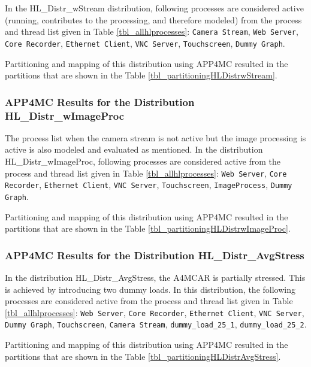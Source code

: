 In the HL{\_}Distr{\_}wStream distribution, following processes are considered active (running, contributes to the processing, and therefore modeled) from the process and thread list given in Table \ref{tbl_allhlprocesses}: \texttt{Camera Stream}, \texttt{Web Server}, \texttt{Core Recorder}, \texttt{Ethernet Client}, \texttt{VNC Server}, \texttt{Touchscreen}, \texttt{Dummy Graph}.

Partitioning and mapping of this distribution using APP4MC resulted in the partitions that are shown in the Table \ref{tbl_partitioningHLDistrwStream}.

\partitioningHLDistrwStream

\subsubsection{APP4MC Results for the Distribution HL{\_}Distr{\_}wImageProc}

The process list when the camera stream is not active but the image processing is active is also modeled and evaluated as mentioned. In the distribution HL{\_}Distr{\_}wImageProc, following processes are considered active from the process and thread list given in Table \ref{tbl_allhlprocesses}: \texttt{Web Server}, \texttt{Core Recorder}, \texttt{Ethernet Client}, \texttt{VNC Server}, \texttt{Touchscreen}, \texttt{ImageProcess}, \texttt{Dummy Graph}.

Partitioning and mapping of this distribution using APP4MC resulted in the partitions that are shown in the Table \ref{tbl_partitioningHLDistrwImageProc}.

\partitioningHLDistrwImageProc


\subsubsection{APP4MC Results for the Distribution HL{\_}Distr{\_}AvgStress}

In the distribution HL{\_}Distr{\_}AvgStress, the A4MCAR is partially stressed. This is achieved by introducing two dummy loads. In this distribution, the following processes are considered active from the process and thread list given in Table \ref{tbl_allhlprocesses}: \texttt{Web Server}, \texttt{Core Recorder}, \texttt{Ethernet Client}, \texttt{VNC Server}, \texttt{Dummy Graph}, \texttt{Touchscreen}, \texttt{Camera Stream}, \texttt{dummy{\_}load{\_}25{\_}1}, \texttt{dummy{\_}load{\_}25{\_}2}.

Partitioning and mapping of this distribution using APP4MC resulted in the partitions that are shown in the Table \ref{tbl_partitioningHLDistrAvgStress}.


